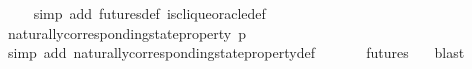 \begin{isabellebody}
\ \ \ \isamarkupfalse%
\ {\isacharparenleft}simp\ add{\isacharcolon}\ futures{\isacharunderscore}def\ is{\isacharunderscore}clique{\isacharunderscore}oracle{\isacharunderscore}def{\isacharparenright}\isanewline
\ \ \ \isamarkupfalse%
\ \isanewline
\ \isamarkupfalse%
\ \isamarkupfalse%
\ {\isachardoublequoteopen}naturally{\isacharunderscore}corresponding{\isacharunderscore}state{\isacharunderscore}property\ p\ {\isasymsigma}{\isacharprime}{\isachardoublequoteclose}\isanewline
\ \ \ \isamarkupfalse%
\ {\isacharparenleft}simp\ add{\isacharcolon}\ naturally{\isacharunderscore}corresponding{\isacharunderscore}state{\isacharunderscore}property{\isacharunderscore}def{\isacharparenright}\isanewline
\ \ \ \isamarkupfalse%
\ {\isacartoucheopen}{\isasymsigma}{\isacharprime}\ {\isasymin}\ futures\ {\isasymsigma}{\isacartoucheclose}\ \isamarkupfalse%
\ blast\ \ \isanewline
{}\isamarkupfalse%
%
\endisatagproof
{\isafoldproof}%
%
\isadelimproof
\ \ \ \ \ \ \ \ \ \ \ \ \isanewline
%
\endisadelimproof
%
\isadelimtheory
\ \ \ \ \isanewline
%
\endisadelimtheory
%
\isatagtheory
{}\isamarkupfalse%
%
\endisatagtheory
{\isafoldtheory}%
%
\isadelimtheory
%
\endisadelimtheory
%
\end{isabellebody}%
\endinput
